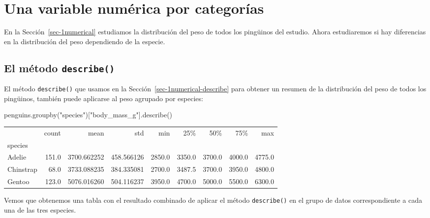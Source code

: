\documentclass[
  a4paper,
  noprof,
  12pt,
  notoc,
  nosols,
  nobib]{mnye}
\newenvironment{Shaded}{\begin{snugshade}}{\end{snugshade}}
\newcommand{\NormalTok}[1]{\textcolor[rgb]{0.00,0.23,0.31}{#1}}
\newcommand{\StringTok}[1]{\textcolor[rgb]{0.13,0.47,0.30}{#1}}
\theoremstyle{definition}
\theoremstyle{remark}
\begin{document}

\hypertarget{una-variable-numuxe9rica-por-categoruxedas}{%
\section{Una variable numérica por
categorías}\label{una-variable-numuxe9rica-por-categoruxedas}}

En la Sección~\ref{sec-1numerical} estudiamos la distribución del peso
de todos los pingüinos del estudio. Ahora estudiaremos si hay
diferencias en la distribución del peso dependiendo de la especie.

\hypertarget{el-muxe9todo-describe}{%
\subsection{\texorpdfstring{El método
\texttt{describe()}}{El método describe()}}\label{el-muxe9todo-describe}}

El método \texttt{describe()} que usamos en la
Sección~\ref{sec-1numerical-describe} para obtener un resumen de la
distribución del peso de todos los pingüinos, también puede aplicarse al
peso agrupado por especies:

\begin{Shaded}
\begin{Highlighting}[]
\NormalTok{penguins.groupby(}\StringTok{"species"}\NormalTok{)[}\StringTok{"body\_mass\_g"}\NormalTok{].describe()}
\end{Highlighting}
\end{Shaded}

\begin{tabular}{lrrrrrrrr}
\toprule
{} &  count &         mean &         std &     min &     25\% &     50\% &     75\% &     max \\
species   &        &              &             &         &         &         &         &         \\
\midrule
Adelie    &  151.0 &  3700.662252 &  458.566126 &  2850.0 &  3350.0 &  3700.0 &  4000.0 &  4775.0 \\
Chinstrap &   68.0 &  3733.088235 &  384.335081 &  2700.0 &  3487.5 &  3700.0 &  3950.0 &  4800.0 \\
Gentoo    &  123.0 &  5076.016260 &  504.116237 &  3950.0 &  4700.0 &  5000.0 &  5500.0 &  6300.0 \\
\bottomrule
\end{tabular}

Vemos que obtenemos una tabla con el resultado combinado de aplicar el
método \texttt{describe()} en el grupo de datos correspondiente a cada
una de las tres especies.
\end{document}
